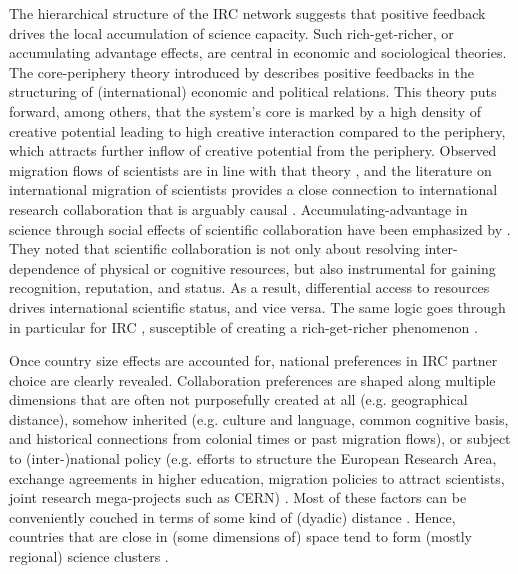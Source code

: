 The hierarchical structure of the IRC network suggests that positive feedback drives the local accumulation of science capacity. Such rich-get-richer, or accumulating advantage effects, are central in economic and sociological theories. The core-periphery theory introduced by \cite{friedmann1967general} describes positive feedbacks in the structuring of (international) economic and political relations. This theory puts forward, among others, that the system's core is marked by a high density of creative potential leading to high creative interaction compared to the periphery, which attracts further inflow of creative potential from the periphery. Observed migration flows of scientists are in line with that theory \citep{stephan2001exceptional}, and the literature on international migration of scientists provides a close connection to international research collaboration that is arguably causal \citep{jonkers2008chinese,kato2017national}. Accumulating-advantage in science through social effects of scientific collaboration have been emphasized by \cite{beaver1979studies}. They noted that scientific collaboration is not only about resolving inter-dependence of physical or cognitive resources, but also instrumental for gaining recognition, reputation, and status. As a result, differential access to resources drives international scientific status, and vice versa. The same logic goes through in particular for IRC \citep{melkers2010social}, susceptible of creating a rich-get-richer phenomenon \citep{hancean2021coauthorship,katz2000scale,wagner2005network,wagner2019international}. 

Once country size effects are accounted for, national preferences in IRC partner choice are clearly revealed. Collaboration preferences are shaped along multiple dimensions that are often not purposefully created at all (e.g. geographical distance), somehow inherited (e.g. culture and language, common cognitive basis, and historical connections from colonial times or past migration flows), or subject to (inter-)national policy (e.g. efforts to structure the European Research Area, exchange agreements in higher education, migration policies to attract scientists, joint research mega-projects such as CERN) \citep[][and the literature cited therein]{davidson1979international,luukkonen1992understanding,zitt2000shadows,frenken2009spatial}. Most of these factors can be conveniently couched in terms of some kind of (dyadic) distance \citep{frenken2009spatial}. Hence, countries that are close in (some dimensions of) space tend to form (mostly regional) science clusters \citep{wagner2005network}. 

